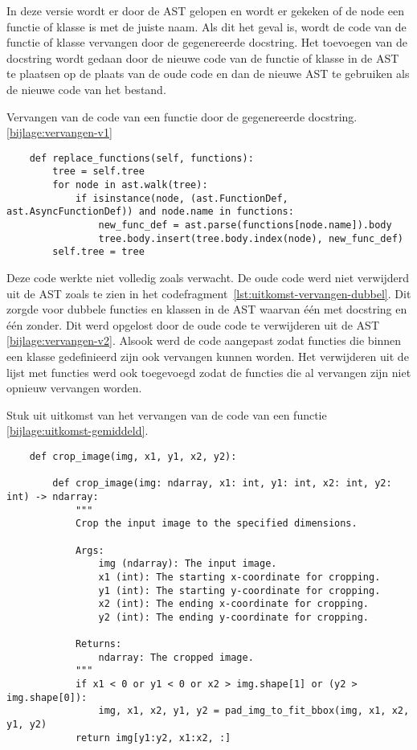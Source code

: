 In deze versie wordt er door de AST gelopen en wordt er gekeken of de node een functie of klasse is met de juiste naam. 
Als dit het geval is, wordt de code van de functie of klasse vervangen door de gegenereerde docstring.
Het toevoegen van de docstring wordt gedaan door de nieuwe code van de functie of klasse in de AST te plaatsen op de plaats van de oude code en dan de nieuwe AST te gebruiken als de nieuwe code van het bestand.

\begin{listing}
    \caption[Code voor het vervangen van een docstring]{Vervangen van de code van een functie door de gegenereerde docstring. \ref{bijlage:vervangen-v1}}
    \label{lst:vervangen-v1}
    \begin{verbatim}
    def replace_functions(self, functions):
        tree = self.tree
        for node in ast.walk(tree):
            if isinstance(node, (ast.FunctionDef, ast.AsyncFunctionDef)) and node.name in functions:
                new_func_def = ast.parse(functions[node.name]).body
                tree.body.insert(tree.body.index(node), new_func_def)        
        self.tree = tree

    \end{verbatim}
\end{listing}

Deze code werkte niet volledig zoals verwacht. De oude code werd niet verwijderd uit de AST zoals te zien in het codefragment~\ref{lst:uitkomst-vervangen-dubbel}. 
Dit zorgde voor dubbele functies en klassen in de AST waarvan één met docstring en één zonder. Dit werd opgelost door de oude code te verwijderen uit de AST \ref{bijlage:vervangen-v2}.
Alsook werd de code aangepast zodat functies die binnen een klasse gedefinieerd zijn ook vervangen kunnen worden.
Het verwijderen uit de lijst met functies werd ook toegevoegd zodat de functies die al vervangen zijn niet opnieuw vervangen worden.

\begin{listing}
    \caption{Stuk uit uitkomst van het vervangen van de code van een functie \ref{bijlage:uitkomst-gemiddeld}.}
    \label{lst:uitkomst-vervangen-dubbel}
    \begin{verbatim}
    def crop_image(img, x1, y1, x2, y2):

        def crop_image(img: ndarray, x1: int, y1: int, x2: int, y2: int) -> ndarray:
            """
            Crop the input image to the specified dimensions.

            Args:
                img (ndarray): The input image.
                x1 (int): The starting x-coordinate for cropping.
                y1 (int): The starting y-coordinate for cropping.
                x2 (int): The ending x-coordinate for cropping.
                y2 (int): The ending y-coordinate for cropping.

            Returns:
                ndarray: The cropped image.
            """
            if x1 < 0 or y1 < 0 or x2 > img.shape[1] or (y2 > img.shape[0]):
                img, x1, x2, y1, y2 = pad_img_to_fit_bbox(img, x1, x2, y1, y2)
            return img[y1:y2, x1:x2, :]
    \end{verbatim}
\end{listing}

